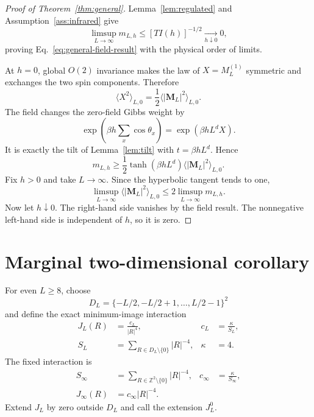 \documentclass[aps,prb,twocolumn,groupedaddress,amsmath,amssymb,
               superscriptaddress,nofootinbib,floatfix]{revtex4-2}
\theoremstyle{plain}
\theoremstyle{definition}
\begin{document}
\begin{proof}[Proof of Theorem~\ref{thm:general}]
Lemma~\ref{lem:regulated} and Assumption~\ref{ass:infrared} give
\begin{equation}
 \limsup_{L\to\infty}m_{L,h}
 \le[TI(h)]^{-1/2}
 \xrightarrow[h\downarrow0]{}0,
\end{equation}
proving Eq.~\eqref{eq:general-field-result} with the physical order of
limits.

At $h=0$, global $O(2)$ invariance makes the law of
$X=M_L^{(1)}$ symmetric and exchanges the two spin components.  Therefore
\begin{equation}
 \langle X^2\rangle_{L,0}
 =
 \frac12\langle|\bm M_L|^2\rangle_{L,0}.
\label{eq:rotational-second-moment}
\end{equation}
The field changes the zero-field Gibbs weight by
\begin{equation}
 \exp\left(\beta h\sum_x\cos\theta_x\right)
 =\exp(\beta hL^dX).
\end{equation}
It is exactly the tilt of Lemma~\ref{lem:tilt} with
$t=\beta hL^d$.  Hence
\begin{equation}
 m_{L,h}
 \ge
 \frac12\tanh(\beta hL^d)
 \langle|\bm M_L|^2\rangle_{L,0}.
\label{eq:field-zero-bridge}
\end{equation}
Fix $h>0$ and take $L\to\infty$.  Since the hyperbolic tangent tends to one,
\begin{equation}
 \limsup_{L\to\infty}
 \langle|\bm M_L|^2\rangle_{L,0}
 \le
 2\limsup_{L\to\infty}m_{L,h}.
\end{equation}
Now let $h\downarrow0$.  The right-hand side vanishes by the field result.
The nonnegative left-hand side is independent of $h$, so it is zero.
\end{proof}

\section{Marginal two-dimensional corollary}

For even $L\ge8$, choose
\begin{equation}
 D_L=\{-L/2,-L/2+1,\ldots,L/2-1\}^2
\end{equation}
and define the exact minimum-image interaction
\begin{align}
 J_L(R)&=\frac{c_L}{|R|^4},
 &c_L&=\frac{\kappa}{S_L},\nonumber\\
 S_L&=\sum_{R\in D_L\setminus\{0\}}|R|^{-4},
 &\kappa&=4.
\label{eq:MI-coupling}
\end{align}
The fixed interaction is
\begin{align}
 S_\infty&=\sum_{R\in\mathbb Z^2\setminus\{0\}}|R|^{-4},
 &c_\infty&=\frac{\kappa}{S_\infty},\nonumber\\
 J_\infty(R)&=c_\infty|R|^{-4}.&&
\label{eq:fixed-coupling}
\end{align}
Extend $J_L$ by zero outside $D_L$ and call the extension $J_L^0$.
\end{document}
